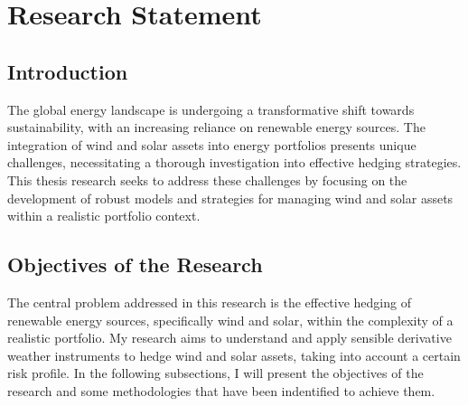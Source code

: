 

%

\chapter{Research Statement}
\label{ch:research-statement}

\section{Introduction}
\label{sec:rs_intro}

    The global energy landscape is undergoing a transformative shift towards sustainability,
    with an increasing reliance on renewable energy sources.
    The integration of wind and solar assets into energy portfolios presents unique challenges,
    necessitating a thorough investigation into effective hedging strategies.
    This thesis research seeks to address these challenges by focusing on the development of robust models and strategies
    for managing wind and solar assets within a realistic portfolio context.

\section{Objectives of the Research}
    \label{sec:rs_objectives}


    The central problem addressed in this research is the effective hedging of renewable energy sources,
    specifically wind and solar, within the complexity of a realistic portfolio.
    My research aims to understand and apply sensible derivative weather instruments to hedge wind and solar assets,
    taking into account a certain risk profile.
    In the following subsections, I will present the objectives of the research and some methodologies that have been
    indentified to achieve them.

